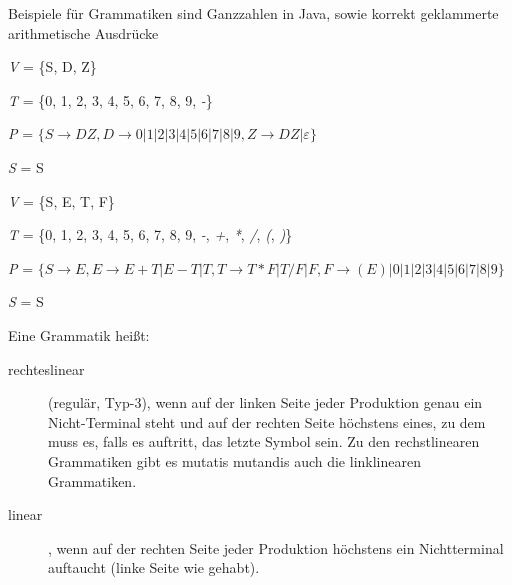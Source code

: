 \documentclass[11pt, a4paper]{article}
\begin{document}
\begin{flushleft}
    Beispiele für Grammatiken sind Ganzzahlen in Java, sowie korrekt geklammerte arithmetische Ausdrücke

    \begin{tcolorbox}[title = Beispiel 1.2, colbacktitle = white, coltitle = black, colframe = black, colback = white, fonttitle = \bfseries]
        \begin{description}
            \item\emph{V} = \{S, D, Z\}

            \item\emph{T} = \{0, 1, 2, 3, 4, 5, 6, 7, 8, 9, \textit{-}\}

            \item\emph{P} = \(\{S \rightarrow DZ, D \rightarrow 0 | 1 | 2 | 3 | 4 | 5 | 6 | 7 | 8 | 9, Z \rightarrow DZ | \varepsilon\}\)

            \item\emph{S} = S
        \end{description}
    \end{tcolorbox}

    \begin{tcolorbox}[title = Beispiel 1.3, colbacktitle = white, coltitle = black, colframe = black, colback = white, fonttitle = \bfseries]
        \begin{description}
            \item\emph{V} = \{S, E, T, F\}

            \item\emph{T} = \{0, 1, 2, 3, 4, 5, 6, 7, 8, 9, \textit{-}, \textit{+}, \textit{*}, \textit{/}, \textit{(}, \textit{)}\}

            \item\emph{P} = \(\{S \rightarrow E, E \rightarrow E + T | E - T | T, T \rightarrow T * F | T / F | F, F \rightarrow (E) | 0 | 1 | 2 | 3 | 4 | 5 | 6 | 7 | 8 | 9\}\)

            \item\emph{S} = S
        \end{description}
    \end{tcolorbox}

    \begin{tcolorbox}[title = Definition 1.6]
        Eine Grammatik heißt:
        \begin{description}

            \item[rechteslinear] (regulär, Typ-3), wenn auf der linken Seite jeder Produktion genau ein Nicht-Terminal steht und auf der rechten Seite höchstens eines, zu dem muss es, falls es auftritt, das letzte Symbol sein. \linebreak Zu den rechstlinearen Grammatiken gibt es mutatis mutandis auch die linklinearen Grammatiken.
                \item[linear], wenn auf der rechten Seite jeder Produktion höchstens ein Nichtterminal auftaucht (linke Seite wie gehabt).


\end{description}
\end{tcolorbox}
\end{flushleft}
\end{document}
